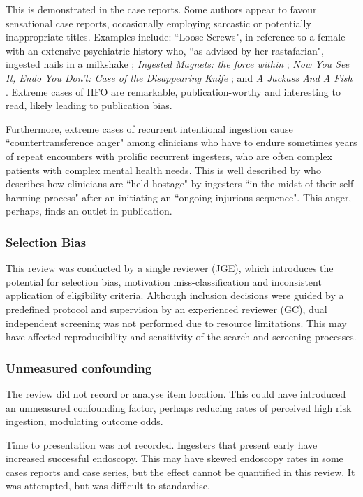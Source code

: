 This is demonstrated in the case reports. Some authors appear to favour sensational case reports, occasionally employing sarcastic or potentially inappropriate titles. Examples include: ``Loose Screws", in reference to a female with an extensive psychiatric history who, ``as advised by her rastafarian", ingested nails in a milkshake \cite{Hardy_2023g}; \textit{Ingested Magnets: the force within} \cite{Tay_2004}; \textit{Now You See It, Endo You Don't: Case of the Disappearing Knife} \cite{Fine_2013}; and \textit{A Jackass And A Fish} \cite{Benoist_2019e}. Extreme cases of IIFO are remarkable, publication-worthy and interesting to read, likely leading to publication bias.

Furthermore, extreme cases of recurrent intentional ingestion cause ``countertransference anger" \cite{Palese_2012} among clinicians who have to endure sometimes years of repeat encounters with prolific recurrent ingesters, who are often complex patients with complex mental health needs. This is well described by \citet{Gitlin_2007} who describes how clinicians are ``held hostage" by ingesters ``in the midst of their self-harming process" after an initiating an ``ongoing injurious sequence". This anger, perhaps, finds an outlet in publication.

\subsubsection{Selection Bias}
This review was conducted by a single reviewer (JGE), which introduces the potential for selection bias, motivation miss-classification and inconsistent application of eligibility criteria. Although inclusion decisions were guided by a predefined protocol and supervision by an experienced reviewer (GC), dual independent screening was not performed due to resource limitations. This may have affected reproducibility and sensitivity of the search and screening processes.

\subsubsection{Unmeasured confounding}
The review did not record or analyse item location. This could have introduced an unmeasured confounding factor, perhaps reducing rates of perceived high risk ingestion, modulating outcome odds. 

Time to presentation was not recorded. Ingesters that present early have increased successful endoscopy. This may have skewed endoscopy rates in some cases reports and case series, but the effect cannot be quantified in this review. It was attempted, but was difficult to standardise.

